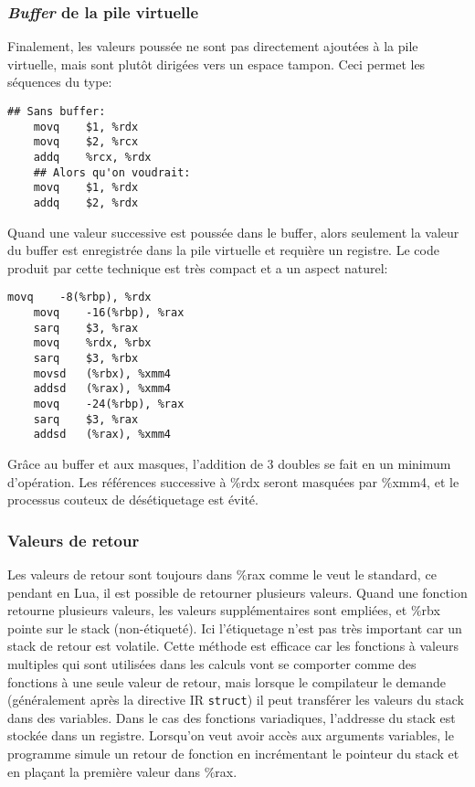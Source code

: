 \documentclass{article}
\newcommand{\R}[1]{\%{}{#1}}
\begin{document}
\subsubsection{\textit{Buffer} de la pile virtuelle}
Finalement, les valeurs poussée ne sont pas directement ajoutées à la pile virtuelle, mais sont plutôt dirigées vers un espace tampon. Ceci permet les séquences du type:
\begin{center}
  \begin{lstlisting}[style=asm, caption={Comparaison du code produit avec et sans buffer},label=DescriptiveLabel]
	## Sans buffer:
	movq	$1, %rdx
	movq	$2, %rcx
	addq	%rcx, %rdx
	## Alors qu'on voudrait:
	movq	$1, %rdx
	addq	$2, %rdx
  \end{lstlisting}
\end{center}

Quand une valeur successive est poussée dans le buffer, alors seulement la valeur du buffer est enregistrée dans la pile virtuelle et requière un registre. Le code produit par cette technique est très compact et a un aspect naturel:
\begin{center}
  \begin{lstlisting}[style=asm, caption={Exemple d'utilisation du buffer et des masques},label=DescriptiveLabel]
	movq	-8(%rbp), %rdx
	movq	-16(%rbp), %rax
	sarq	$3, %rax
	movq	%rdx, %rbx
	sarq	$3, %rbx
	movsd	(%rbx), %xmm4
	addsd	(%rax), %xmm4
	movq	-24(%rbp), %rax
	sarq	$3, %rax
	addsd	(%rax), %xmm4
  \end{lstlisting}
\end{center}
Grâce au buffer et aux masques, l'addition de 3 doubles se fait en un minimum d'opération. Les références successive à \R{rdx} seront masquées par \R{xmm4}, et le processus couteux de désétiquetage est évité.

\subsubsection{Valeurs de retour}
Les valeurs de retour sont toujours dans \R{rax} comme le veut le standard, ce pendant en Lua, il est possible de retourner plusieurs valeurs. Quand une fonction retourne plusieurs valeurs, les valeurs supplémentaires sont empliées, et \R{rbx} pointe sur le stack (non-étiqueté). Ici l'étiquetage n'est pas très important car un stack de retour est volatile. Cette méthode est efficace car les fonctions à valeurs multiples qui sont utilisées dans les calculs vont se comporter comme des fonctions à une seule valeur de retour, mais lorsque le compilateur le demande (généralement après la directive IR \texttt{struct}) il peut transférer les valeurs du stack dans des variables. Dans le cas des fonctions variadiques, l'addresse du stack est stockée dans un registre. Lorsqu'on veut avoir accès aux arguments variables, le programme simule un retour de fonction en incrémentant le pointeur du stack et en plaçant la première valeur dans \R{rax}.
\end{document}
